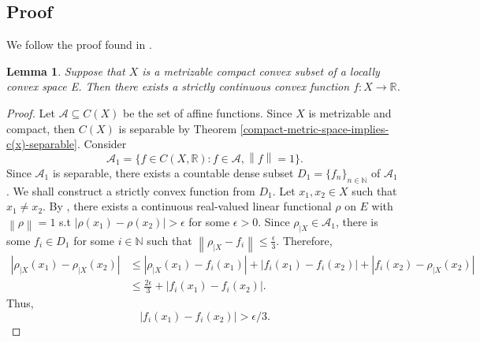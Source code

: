 \documentclass[12pt,a4paper]{amsart}
\newtheorem{lemma}[theorem]{Lemma}
\theoremstyle{definition}
\newcommand{\mynorm}[1]{ \left\| #1 \right\| }
\newcommand{\myabs}[1]{ | #1 | }
\begin{document}
	\subsection{Proof}
	We follow the proof found in \cite[Page 14, Theorem (Choquet)]{phelps}.
	\begin{lemma}\label{existence-strictly-convex-function}
		Suppose that $X$ is a metrizable compact convex subset of a locally convex space E. Then there exists a strictly continuous convex function $f: X \rightarrow \mathbb{R}$.
	\end{lemma}
	\begin{proof}
		Let $\mathcal{A} \subseteq C(X)$ be the set of affine functions. Since $X$ is metrizable and compact, then $C(X)$ is separable by Theorem \ref{compact-metric-space-implies-c(x)-separable}. Consider
		\[ \mathcal{A}_1 = \lbrace f \in C(X, \mathbb{R}) :f \in \mathcal{A}, \mynorm{f} = 1 \rbrace.\] 
		Since $\mathcal{A}_1$ is separable, there exists a countable dense subset $D_1 = \lbrace f_n \rbrace_{n \in \mathbb{N}}$ of $\mathcal{A}_1$ . We shall construct a strictly convex function from $D_1$. Let $x_1, x_2 \in X$ such that $x_1 \neq x_2$. By \cite[Corollary 1.2.11]{kadison-vol-1}, there exists a continuous real-valued linear functional $\rho$ on $E$ with $\mynorm{\rho} =1 $ s.t $\myabs{\rho(x_1) - \rho(x_2)} > \epsilon$ for some $\epsilon > 0$. Since $\rho_{\vert X} \in \mathcal{A}_1$, there is some $f_i \in D_1$ for some $i \in \mathbb{N}$ such that $\mynorm{\rho_{\vert X} - f_i} \leq \frac{\epsilon}{3}$. Therefore, 
		\begin{equation*}
			\begin{split}
				\myabs{\rho_{\vert X}(x_1) - \rho_{\vert X}(x_2)} &\leq \myabs{\rho_{\vert X}(x_1) - f_i(x_1)} + \myabs{f_i(x_1) - f_i(x_2)} + \myabs{f_i(x_2) - \rho_{\vert X}(x_2)} \\
				&\leq \frac{2 \epsilon}{3} + \myabs{f_i(x_1) - f_i(x_2)}.
			\end{split}
		\end{equation*}
		Thus,
		\begin{equation}\label{existence-strictly-convex-function-eq1}
			\myabs{f_i(x_1) - f_i(x_2)} > \epsilon /3.
		\end{equation}
		

\end{proof}
\end{document}
